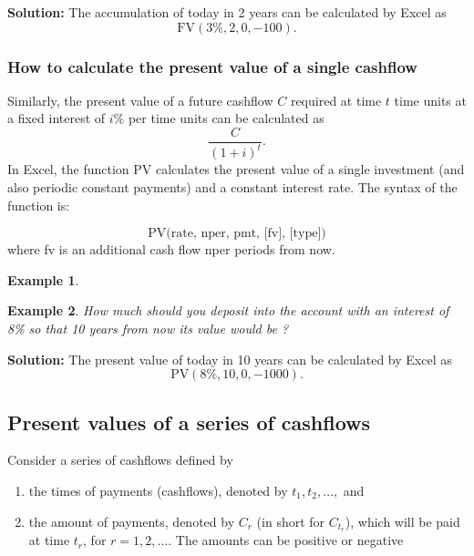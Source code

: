 \documentclass[
]{article}
\theoremstyle{definition}
\theoremstyle{definition}
\newtheorem{example}{Example}[section]
\theoremstyle{definition}
\theoremstyle{definition}
\theoremstyle{remark}
\begin{document}
\textbf{Solution:} The accumulation of today in 2 years can be calculated by Excel as
\[\text{FV}(3\%, 2, 0, -100).\]

\hypertarget{how-to-calculate-the-present-value-of-a-single-cashflow}{%
\subsubsection{How to calculate the present value of a single cashflow}\label{how-to-calculate-the-present-value-of-a-single-cashflow}}

Similarly, the present value of a future cashflow \(C\) required at time
\(t\) time units at a fixed interest of \(i\)\% per time units can be
calculated as \[\frac{C}{(1+i)^t}.\] In Excel, the function PV
calculates the present value of a single investment (and also periodic
constant payments) and a constant interest rate. The syntax of the
function is:

\[\text{PV(rate, nper, pmt, [fv], [type])}\] where fv is an additional
cash flow nper periods from now.

\begin{example}
\protect\hypertarget{exm:unlabeled-div-4}{}\label{exm:unlabeled-div-4}

\textbf{Example 2}. \emph{How much should you deposit into the account with an
interest of 8\% so that 10 years from now its value would be ?}

\end{example}

\textbf{Solution:}
The present value of today in 10 years can be calculated by Excel as
\[\text{PV}(8\%, 10, 0, -1000).\]

\hypertarget{present-values-of-a-series-of-cashflows}{%
\subsection{Present values of a series of cashflows}\label{present-values-of-a-series-of-cashflows}}

Consider a series of cashflows defined by

\begin{enumerate}
\def\labelenumi{\arabic{enumi}.}
\item
  the times of payments (cashflows), denoted by \(t_1, t_2, \ldots,\)
  and
\item
  the amount of payments, denoted by \(C_{r}\) (in short for \(C_{t_r}\)),
  which will be paid at time \(t_r\), for \(r = 1,2, \ldots\). The amounts
  can be positive or negative
\end{enumerate}
\end{document}
